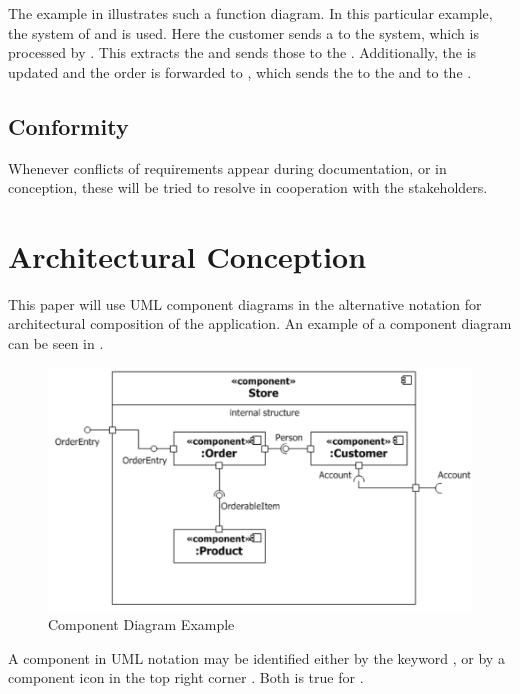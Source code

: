 The example in  illustrates such a function diagram. In this particular example, the system of  and  is used. Here the customer sends a  to the system, which is processed by . This extracts the  and sends those to the . Additionally, the  is updated and the order is forwarded to , which sends the  to the  and  to the .

\subsection{Conformity}
Whenever conflicts of requirements appear during documentation, or in conception, these will be tried to resolve in cooperation with the stakeholders. 

\section{Architectural Conception}
This paper will use UML component diagrams in the alternative notation \parencite[cf.][212]{ObjectManagementGroup.01.03.2015} for architectural composition of the application. An example of a component diagram can be seen in .

\begin{figure}[H]
    \centering
    \includegraphics[width=\textwidth]{img/componentExample.pdf}
    \caption[Component Diagram Example]{Component Diagram Example \parencites[2132]{ObjectManagementGroup.01.03.2015}}
    \label{fig:comEx}
\end{figure}

A component in UML notation may be identified either by the keyword , or by a component icon in the top right corner \parencites[cf.][208]{ObjectManagementGroup.01.03.2015}. Both is true for . 


